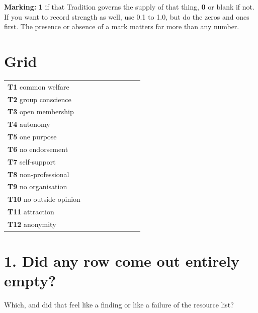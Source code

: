 \documentclass[11pt]{article}
\begin{document}

\begin{note}
\textbf{Marking:} \textbf{1} if that Tradition governs the supply of that thing, \textbf{0} or
blank if not. If you want to record strength as well, use 0.1 to 1.0, but do the zeros and ones
first. The presence or absence of a mark matters far more than any number.
\end{note}

\section{Grid}

\vspace{4pt}
\noindent
\renewcommand{\arraystretch}{2.0}
\setlength{\tabcolsep}{2pt}
\begin{tabular}{@{}p{44mm}|G|G|G|G|G|G|G|G@{}}
 &  &  & 
 &  &  & 
 &  &  \\[10pt]
\hline
\textbf{T1} common welfare    & & & & & & & & \\ \hline
\textbf{T2} group conscience  & & & & & & & & \\ \hline
\textbf{T3} open membership   & & & & & & & & \\ \hline
\textbf{T4} autonomy          & & & & & & & & \\ \hline
\textbf{T5} one purpose       & & & & & & & & \\ \hline
\textbf{T6} no endorsement    & & & & & & & & \\ \hline
\textbf{T7} self-support      & & & & & & & & \\ \hline
\textbf{T8} non-professional  & & & & & & & & \\ \hline
\textbf{T9} no organisation   & & & & & & & & \\ \hline
\textbf{T10} no outside opinion & & & & & & & & \\ \hline
\textbf{T11} attraction       & & & & & & & & \\ \hline
\textbf{T12} anonymity        & & & & & & & & \\ \hline
\end{tabular}

\clearpage
\section{1. Did any row come out entirely empty?}
Which, and did that feel like a finding or like a failure of the resource list?
\answerlines[6]
\end{document}

